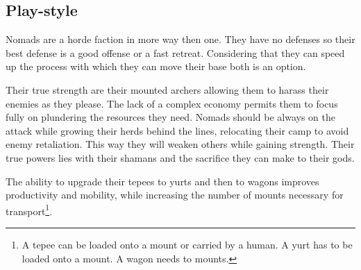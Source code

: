 \subsection{Play-style}
\Gls{Nomads} are a horde faction in more way then one.
They have no defenses so their best defense is a good offense or a fast retreat.
Considering that they can speed up the process with which they can move
their base both is an option.

Their true strength are their mounted archers allowing them to harass their
enemies as they please. The lack of a complex economy permits them to focus
fully on plundering the resources they need. \Gls{Nomads} should be always on
the attack while growing their herds behind the lines, relocating their camp to
avoid enemy retaliation. This way they will weaken others while gaining
strength. Their true powers lies with their shamans and the sacrifice they can
make to their gods.

The ability to upgrade their tepees to yurts and then to wagons improves
productivity and mobility, while increasing the number of mounts necessary for
transport\footnote{ A tepee can be loaded onto a mount or carried by a human. A
	yurt has to be loaded onto a mount. A wagon needs to mounts. }.
